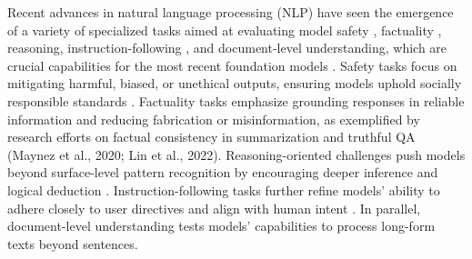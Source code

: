 Recent advances in natural language processing (NLP) have seen the emergence of a variety of specialized tasks aimed at evaluating model safety \citep{bai-etal-2022-hhrlhf}, factuality \citep{dziri-etal-2022-faithdial}, reasoning, instruction-following \citep{pmlr-v162-shp}, and document-level understanding, which are crucial capabilities for the most recent foundation models \citep{reid-etal-2024-gemini, openai-2024-gpt4o, llama3modelcard}. Safety tasks focus on mitigating harmful, biased, or unethical outputs, ensuring models uphold socially responsible standards \citep{bai-etal-2022-hhrlhf}. Factuality tasks emphasize grounding responses in reliable information and reducing fabrication or misinformation, as exemplified by research efforts on factual consistency in summarization and truthful QA (Maynez et al., 2020; Lin et al., 2022). Reasoning-oriented challenges push models beyond surface-level pattern recognition by encouraging deeper inference and logical deduction \citep{xiao2024rarbreasoningretrievalbenchmark}. Instruction-following tasks further refine models’ ability to adhere closely to user directives and align with human intent \citep{ouyang-etal-2022-training}. In parallel, document-level understanding \citep{yin-etal-2021-docnli, dipper} tests models' capabilities to process long-form texts beyond sentences.
